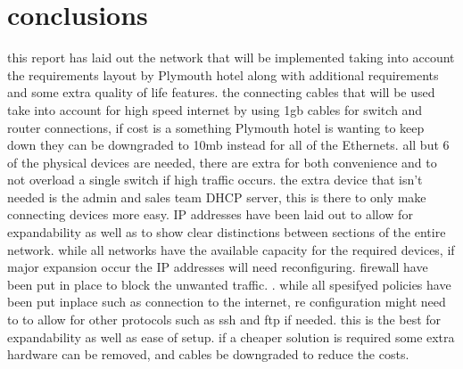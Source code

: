 \documentclass[11pt]{article}
\begin{document}
\section{conclusions  }
this report has laid out the network that will be implemented taking into account the requirements layout by Plymouth hotel along with additional requirements and some extra quality of life features. 
the connecting cables that will be used take into account for high speed internet by using 1gb cables for switch and router connections, if cost is a something Plymouth hotel is wanting to keep down they can be downgraded to 10mb instead for all of the Ethernets. all but 6 of the physical devices are needed, there are extra for both convenience and to not overload a single switch if high traffic occurs. the extra device that isn't needed is the admin and sales team DHCP server, this is there to only make connecting devices more easy. IP addresses have been laid out to allow for expandability as well as to show clear distinctions between sections of the entire network. while all networks have the available capacity for the required devices, if major expansion occur the IP addresses will need reconfiguring. firewall have been put in place to block the unwanted traffic. . while all spesifyed policies have been put inplace such as connection to the internet, re configuration might need to to allow for other protocols such as ssh and ftp if needed. this is the best for expandability as well as ease of setup. if a cheaper solution is required some extra hardware can be removed, and cables be downgraded to reduce the costs.





\restoregeometry
\end{document}
